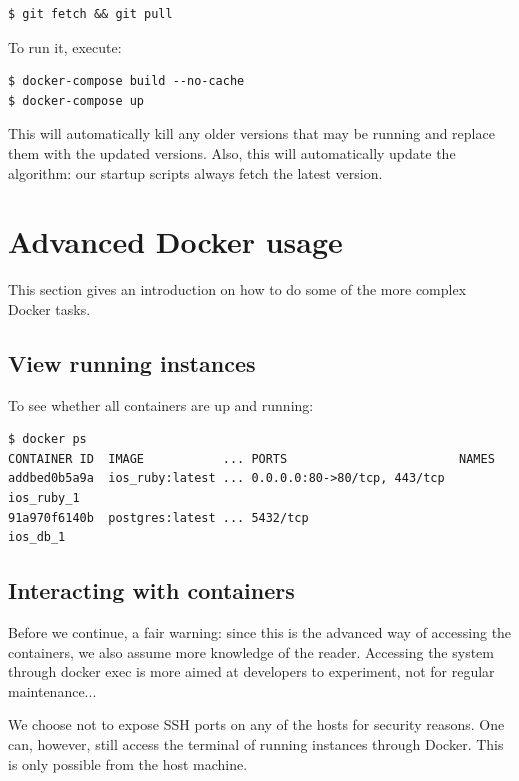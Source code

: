 \begin{verbatim}
$ git fetch && git pull
\end{verbatim}

To run it, execute:
\begin{verbatim}
$ docker-compose build --no-cache
$ docker-compose up
\end{verbatim}

This will automatically kill any older versions that may be running and replace them with the updated versions. Also, this will automatically update the algorithm: our startup scripts always fetch the latest version.

\section{Advanced Docker usage}
This section gives an introduction on how to do some of the more complex Docker tasks.

\subsection{View running instances}
To see whether all containers are up and running:
\begin{verbatim}
$ docker ps
CONTAINER ID  IMAGE           ... PORTS                        NAMES
addbed0b5a9a  ios_ruby:latest ... 0.0.0.0:80->80/tcp, 443/tcp  ios_ruby_1          
91a970f6140b  postgres:latest ... 5432/tcp                     ios_db_1
\end{verbatim}

\subsection{Interacting with containers}
Before we continue, a fair warning: since this is the advanced way of accessing the containers, we also assume more knowledge of the reader. Accessing the system through docker exec is more aimed at developers to experiment, not for regular maintenance...

We choose not to expose SSH ports on any of the hosts for security reasons. One can, however, still access the terminal of running instances through Docker. This is only possible from the host machine. 


